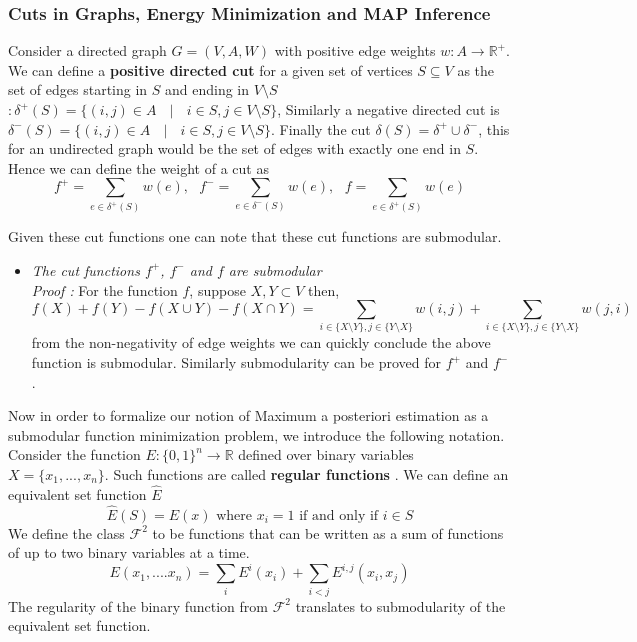 \subsubsection{Cuts in Graphs, Energy Minimization and MAP Inference}
Consider a directed graph $G = (V,A,W)$ with positive edge weights $w:A\rightarrow\mathds{R}^+$. We can define a {\bf positive directed cut} for a given set of vertices $S\subseteq V$ as the set of edges starting in $S$ and ending in $V\setminus S$ $:\delta^+(S) = \{(i,j)\in A\text{ }\mid \text{ }i \in S, j\in V\setminus S\}$, Similarly a negative directed cut is $\delta^-(S) = \{(i,j)\in A\text{ }\mid \text{ }i \in S, j\in V\setminus S\}$. Finally the cut $\delta(S) = \delta^+\cup\delta^-$, this for an undirected graph would be the set of edges with exactly one end in $S$. Hence we can define the weight of a cut as
\[
 f^+ = \underset{e\in\delta^+(S)}{\operatorname{\sum}} w(e), \text{ }  f^- = \underset{e\in\delta^-(S)}{\operatorname{\sum}} w(e), \text{ } f = \underset{e\in\delta^+(S)}{\operatorname{\sum}} w(e)
\]

Given these cut functions one can note that these cut functions are submodular.

\begin{itemize}
\item {\bf \lemma} {\it The cut functions $f^+$, $f^-$ and $f$ are submodular}\\
{\it Proof :} For the function $f$, suppose $X,Y\subset V$ then,
\[
f(X) + f(Y) - f(X\cup Y) - f(X\cap Y) = \underset{i\in\{X\setminus Y\}, j\in\{Y\setminus X\}}{\operatorname{\sum}} w(i,j) + \underset{i\in\{X\setminus Y\}, j\in\{Y\setminus X\}}{\operatorname{\sum}} w(j,i)
\]
from the non-negativity of edge weights we can quickly conclude the above function is submodular. Similarly submodularity can be proved for $f^+$ and $f^-$.
\end{itemize}
 Now in order to formalize our notion of Maximum a posteriori estimation as a submodular function minimization problem, we introduce the following notation. Consider the function $E:\{0,1\}^n\rightarrow\mathds{R}$ defined over binary variables $X=\{x_1,...,x_n\}$. Such functions are called \textbf{regular functions} \cite{Kolmogorov04whatenergy}. We can define an equivalent set function $\hat{E}$
\[
\hat{E}(S) = E(x) \text{ where } x_i = 1 \text{ if and only if } i \in S
\]
We define the class $\mathcal{F}^2$ to be functions that can be written as a sum of functions of up to two binary variables at a time.
\[
E(x_1,....x_n) = \underset{i}{\operatorname{\sum}} E^i(x_i) + \underset{i<j}{\operatorname{\sum}} E^{i,j}(x_i,x_j)
\]
The regularity of the binary function from $\mathcal{F}^2$ translates to submodularity of the equivalent set function. 

